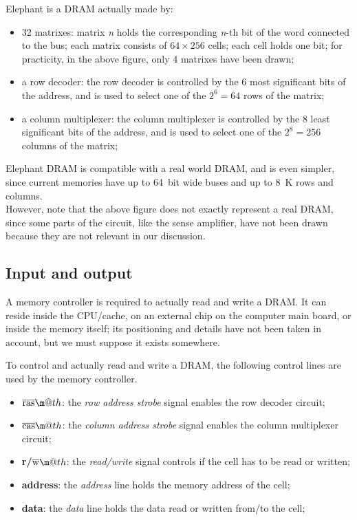 \documentclass[a4paper,12pt]{article}
\makeatletter
\newcommand*{\textoverline}[1]{$\overline{\hbox{#1}}\m@th$}
\newcommand{\memoryname}{Elephant}
\makeatother
\begin{document}
\memoryname{} is a DRAM actually made by:
\begin{itemize}
  \item 32 matrixes: matrix \emph{n} holds the corresponding \emph{n}-th bit of the word connected to the bus;
  each matrix consists of $64 \times 256$ cells;
  each cell holds one bit;
  for practicity, in the above figure, only 4 matrixes have been drawn;
  \item a row decoder: the row decoder is controlled by the 6 most significant bits of the address, and is used to select one of the $2^{6} = 64$ rows of the matrix;
  \item a column multiplexer: the column multiplexer is controlled by the 8 least significant bits of the address, and is used to select one of the $2^{8} = 256$ columns of the matrix;
\end{itemize}

\memoryname{} DRAM is compatible with a real world DRAM, and is even simpler, since current memories have up to 64~bit wide buses and up to 8~K rows and columns.
\\
However, note that the above figure does not exactly represent a real DRAM, since some parts of the circuit, like the sense amplifier, have not been drawn because they are not relevant in our discussion.

\subsection{Input and output}
A memory controller is required to actually read and write a DRAM.
It can reside inside the CPU/cache, on an external chip on the computer main board, or inside the memory itself; its positioning and details have not been taken in account, but we must suppose it exists somewhere.

To control and actually read and write a DRAM, the following control lines are used by the memory controller.

\begin{itemize}
  \item \textbf{\textoverline{ras}}: the \emph{row address strobe} signal enables the row decoder circuit;
  \item \textbf{\textoverline{cas}}: the \emph{column address strobe} signal enables the column multiplexer circuit;
  \item \textbf{r/\textoverline{w}}: the \emph{read/write} signal controls if the cell has to be read or written;
  \item \textbf{address}: the \emph{address} line holds the memory address of the cell;
  \item \textbf{data}: the \emph{data} line holds the data read or written from/to the cell;
\end{itemize}
\end{document}

